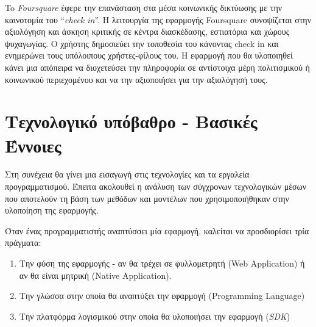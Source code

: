 To \textit{Foursquare} έφερε την επανάσταση στα μέσα κοινωνικής δικτύωσης με την καινοτομία του ``\textit{check in}''.  Η λειτουργία της εφαρμογής Foursquare συνοψίζεται στην αξιολόγηση και άσκηση κριτικής σε κέντρα διασκέδασης, εστιατόρια και χώρους ψυχαγωγίας. Ο χρήστης δημοσιεύει την τοποθεσία του κάνοντας check in και ενημερώνει τους υπόλοιπους χρήστες-φίλους του. Η εφαρμογή που θα υλοποιηθεί κάνει μια απόπειρα να διοχετεύσει την πληροφορία σε αντίστοιχα μέρη πολιτισμικού ή κοινωνικού περιεχομένου και να την αξιοποιήσει για την αξιολόγησή τους.


\section{Τεχνολογικό υπόβαθρο - Βασικές Έννοιες}
Στη συνέχεια θα γίνει μια εισαγωγή στις τεχνολογίες και τα εργαλεία προγραμματισμού. Έπειτα ακολουθεί η ανάλυση των σύγχρονων τεχνολογικών μέσων που αποτελούν τη βάση των μεθόδων και μοντέλων που χρησιμοποιήθηκαν στην υλοποίηση της εφαρμογής. 

Όταν ένας προγραμματιστής αναπτύσσει μία εφαρμογή, καλείται να προσδιορίσει τρία πράγματα:
\begin{enumerate}
\item Tην φύση της εφαρμογής - αν θα τρέχει σε φυλλομετρητή (Web Application) ή αν θα είναι μητρική (Native Application).
\item Την γλώσσα στην οποία θα αναπτύξει την εφαρμογή (Programming Language)
\item Την πλατφόρμα λογισμικού στην οποία θα υλοποιήσει την εφαρμογή (\textit{SDK})
\end{enumerate}

